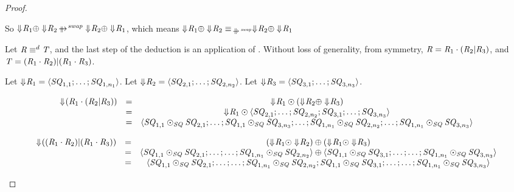 \documentclass[numbers,10pt,preprint\ifanon ,nocopyrightspace\fi]{sigplanconf}
\begin{document}
\begin{proof}
\begin{case}[\OrCommutativityRule{}]
    So $\ToDNFRegexOf{\Regex_1} \OrDNF \ToDNFRegexOf{\Regex_2}
    \ParallelRewriteSwap
    \ToDNFRegexOf{\Regex_2} \OrDNF \ToDNFRegexOf{\Regex_1}$, which means
    $\ToDNFRegexOf{\Regex_1} \OrDNF \ToDNFRegexOf{\Regex_2}
    \EquivalenceOf{\ParallelRewriteSwap}
    \ToDNFRegexOf{\Regex_2} \OrDNF \ToDNFRegexOf{\Regex_1}$
  \end{case}

  \begin{case}[\DistributivityLeftRule{}]
    Let $\mathit{R} \equiv^d \mathit{T}$, and the last step of the
    deduction is an application of \DistributivityLeftRule{}.  Without loss of
    generality, from symmetry,
    $\mathit{R} = \mathit{R}_1 \cdot (\mathit{R}_2 | \mathit{R}_3)$, and
    $\mathit{T} = (\mathit{R}_1 \cdot \mathit{R}_2) | (\mathit{R}_1 \cdot \mathit{R}_3)$.

    Let $\Downarrow\mkern-4mu \mathit{R}_1 =
    \langle\mathit{SQ}_{1,1};\ldots;\mathit{SQ}_{1,n_1}\rangle$.
    Let $\Downarrow\mkern-4mu \mathit{R}_2 =
    \langle\mathit{SQ}_{2,1};\ldots;\mathit{SQ}_{2,n_2}\rangle$.
    Let $\Downarrow\mkern-4mu \mathit{R}_3 =
    \langle\mathit{SQ}_{3,1};\ldots;\mathit{SQ}_{3,n_3}\rangle$.

    \[
      \begin{array}{ccc}
        \Downarrow\mkern-4mu (\mathit{R}_1 \cdot (\mathit{R}_2 | \mathit{R}_3))
        & = & \Downarrow\mkern-4mu \mathit{R}_1 \odot (\Downarrow\mkern-4mu \mathit{R}_2 \oplus
              \Downarrow\mkern-4mu \mathit{R}_3)\\
        & = & \Downarrow\mkern-4mu \mathit{R}_1 \odot
              \langle\mathit{SQ}_{2,1};\ldots;\mathit{SQ}_{2,n_2};
              \mathit{SQ}_{3,1};\ldots;\mathit{SQ}_{3,n_3}\rangle\\
        & = & \langle\mathit{SQ}_{1,1}\odot_{\mathit{SQ}}\mathit{SQ}_{2,1};
              \ldots;\mathit{SQ}_{1,1}\odot_{\mathit{SQ}}\mathit{SQ}_{3,n_3};\ldots;
              \mathit{SQ}_{1,n_1}\odot_{\mathit{SQ}}\mathit{SQ}_{2,n_2};
              \ldots;\mathit{SQ}_{1,n_1}\odot_{\mathit{SQ}}\mathit{SQ}_{3,n_3}\rangle
      \end{array}
    \]

    \[
      \begin{array}{ccc}
        \Downarrow\mkern-4mu ((\mathit{R}_1 \cdot \mathit{R}_2) | (\mathit{R}_1 \cdot \mathit{R}_3))
        & = & (\Downarrow\mkern-4mu \mathit{R}_1 \odot \Downarrow\mkern-4mu \mathit{R}_2)
              \oplus
              (\Downarrow\mkern-4mu \mathit{R}_1 \odot \Downarrow\mkern-4mu \mathit{R}_3)\\
        & = & \langle\mathit{SQ}_{1,1}\odot_{\mathit{SQ}}\mathit{SQ}_{2,1};
              \ldots;\ldots;
              \mathit{SQ}_{1,n_1}\odot_{\mathit{SQ}}\mathit{SQ}_{2,n_2}\rangle \oplus
              \langle\mathit{SQ}_{1,1}\odot_{\mathit{SQ}}\mathit{SQ}_{3,1};
              \ldots;\ldots;
              \mathit{SQ}_{1,n_1}\odot_{\mathit{SQ}}\mathit{SQ}_{3,n_3}\rangle\\
        & = & \langle\mathit{SQ}_{1,1}\odot_{\mathit{SQ}}\mathit{SQ}_{2,1};
              \ldots;\ldots;
              \mathit{SQ}_{1,n_1}\odot_{\mathit{SQ}}\mathit{SQ}_{2,n_2};
              \mathit{SQ}_{1,1}\odot_{\mathit{SQ}}\mathit{SQ}_{3,1};
              \ldots;\ldots;
              \mathit{SQ}_{1,n_1}\odot_{\mathit{SQ}}\mathit{SQ}_{3,n_3}\rangle
      \end{array}
    \]


\end{case}
\end{proof}
\end{document}
